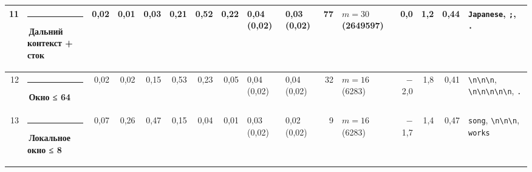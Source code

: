 \documentclass[10pt]{article}
\begin{document}
\begin{minipage}{\linewidth}
\begin{center}
{\begin{tabular}{|r|l|r|r|r|r|r|r|l|l|r|l|r|r|r|l|}
11 & \textcolor[HTML]{C3C2B7}{\rule{0.62em}{0.62em}}\,Дальний контекст + сток & 0,02 & 0,01 & 0,03 & 0,21 & 0,52 & 0,22 & 0,04 (0,02) & 0,03 (0,02) & 77 & $m{=}30$ (2649597) & 0,0 & 1,2 & 0,44 & \texttt{\textvisiblespace{}Japanese}, \texttt{\textvisiblespace{};}, \texttt{\textvisiblespace{}.} \\ \hline
12 & \textcolor[HTML]{EDA100}{\rule{0.62em}{0.62em}}\,\textbf{Окно ≤ 64} & 0,02 & 0,02 & 0,15 & 0,53 & 0,23 & 0,05 & 0,04 (0,02) & 0,04 (0,02) & 32 & $m{=}16$ (6283) & $-$2,0 & 1,8 & 0,41 & \texttt{\textvisiblespace{}\textbackslash{}n\textbackslash{}n\textbackslash{}n}, \texttt{\textbackslash{}n\textbackslash{}n\textbackslash{}n\textbackslash{}n\textbackslash{}n}, \texttt{\textvisiblespace{}.} \\ \hline
13 & \textcolor[HTML]{1BAF7A}{\rule{0.62em}{0.62em}}\,\textbf{Локальное окно ≤ 8} & 0,07 & 0,26 & 0,47 & 0,15 & 0,04 & 0,01 & 0,03 (0,02) & 0,02 (0,02) & 9 & $m{=}16$ (6283) & $-$1,7 & 1,4 & 0,47 & \texttt{\textvisiblespace{}song}, \texttt{\textvisiblespace{}\textbackslash{}n\textbackslash{}n\textbackslash{}n}, \texttt{\textvisiblespace{}works} \\ \hline
\hline\end{tabular}}\end{center}
\end{minipage}
\par\vspace{0.4em}
\end{document}
